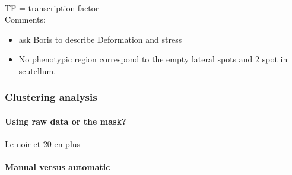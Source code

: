 \documentclass[]{article}
\begin{document}
\\
\newline
TF = transcription factor\\
Comments:
\begin{itemize} 
\item ask Boris to describe Deformation and stress\\
\item No phenotypic region correspond to the empty lateral spots and 2 spot in scutellum.
\end{itemize}
\subsubsection{Clustering analysis}
\paragraph{Using raw data or the mask?}
Le noir et 20 en plus 
\paragraph{Manual versus automatic}
\end{document}
